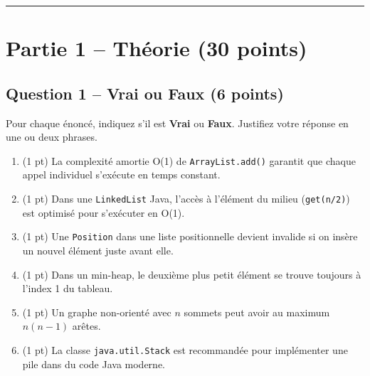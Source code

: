 \documentclass[11pt,letterpaper]{article}
\begin{document}
\vspace{1em}
\hrule
\vspace{1em}

\section*{Partie 1 -- Théorie (30 points)}

\subsection*{Question 1 -- Vrai ou Faux (6 points)}

Pour chaque énoncé, indiquez s'il est \textbf{Vrai} ou \textbf{Faux}. Justifiez votre réponse en une ou deux phrases.

\begin{enumerate}[label=\alph*)]
    \item (1 pt) La complexité amortie O(1) de \texttt{ArrayList.add()} garantit que chaque appel individuel s'exécute en temps constant.

    \vspace{3cm}

    \item (1 pt) Dans une \texttt{LinkedList} Java, l'accès à l'élément du milieu (\texttt{get(n/2)}) est optimisé pour s'exécuter en O(1).

    \vspace{3cm}

    \item (1 pt) Une \texttt{Position} dans une liste positionnelle devient invalide si on insère un nouvel élément juste avant elle.

    \vspace{3cm}

    \item (1 pt) Dans un min-heap, le deuxième plus petit élément se trouve toujours à l'index 1 du tableau.

    \vspace{3cm}

    \item (1 pt) Un graphe non-orienté avec $n$ sommets peut avoir au maximum $n(n-1)$ arêtes.

    \vspace{3cm}

    \item (1 pt) La classe \texttt{java.util.Stack} est recommandée pour implémenter une pile dans du code Java moderne.

    \vspace{3cm}
\end{enumerate}
\end{document}
